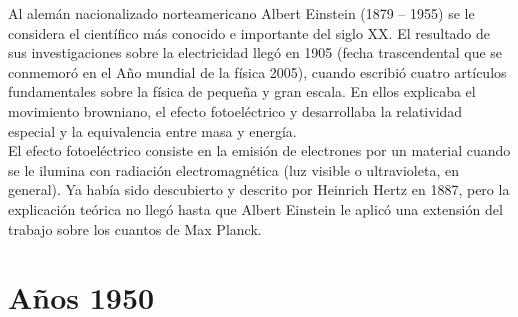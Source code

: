 \documentclass{article}
\begin{document}
Al alemán nacionalizado norteamericano Albert Einstein (1879 – 1955) se le considera el científico más conocido e importante del siglo XX. El resultado de sus investigaciones sobre la electricidad llegó en 1905 (fecha trascendental que se conmemoró en el Año mundial de la física 2005), cuando escribió cuatro artículos fundamentales sobre la física de pequeña y gran escala. En ellos explicaba el movimiento browniano, el efecto fotoeléctrico y desarrollaba la relatividad especial y la equivalencia entre masa y energía.\citep{HDE}\\

El efecto fotoeléctrico consiste en la emisión de electrones por un material cuando se le ilumina con radiación electromagnética (luz visible o ultravioleta, en general). Ya había sido descubierto y descrito por Heinrich Hertz en 1887, pero la explicación teórica no llegó hasta que Albert Einstein le aplicó una extensión del trabajo sobre los cuantos de Max Planck. \citep{HDE}\\



\section{Años 1950}
\end{document}
